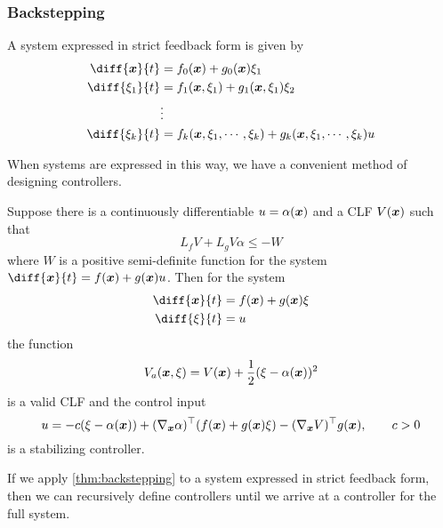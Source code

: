 \subsubsection{Backstepping}
\begin{definition}
	A system expressed in strict feedback form is given by \[
		\begin{aligned}
			\diff{\bs{x}}{t} &= f_0(\bs{x}) + g_0(\bs{x})\xi_1\\
			\diff{\xi_1}{t} &= f_1(\bs{x}, \xi_1) + g_1(\bs{x}, \xi_1)\xi_2\\
			&\vdots\\
			\diff{\xi_k}{t} &= f_k(\bs{x}, \xi_1,\cdots,\xi_k) + g_k(\bs{x},
			\xi_1,\cdots,\xi_k)u\\
		\end{aligned}
	\]
	\label{defn:strict-feedback-form}
\end{definition}
When systems are expressed in this way, we have a convenient method of designing
controllers.
\begin{theorem}
	Suppose there is a continuously differentiable $u=\alpha(\boldsymbol{x})$ and a CLF
	$V(\boldsymbol{x})$ such that \[
		L_fV + L_gV\alpha \leq -W
	\] where $W$ is a positive semi-definite function for the system
	$\diff{\bs{x}}{t} = f(\bs{x})+g(\bs{x})u$. Then for the system \[
		\begin{aligned}
			\diff{\bs{x}}{t} &= f(\bs{x}) + g(\bs{x})\xi\\
			\diff{\xi}{t} &= u
		\end{aligned}
	\]
	the function \[
		V_a(\boldsymbol{x},\xi) = V(\boldsymbol{x}) + \frac{1}{2}(\xi - \alpha(\boldsymbol{x}))^2
	\] is a valid CLF and the control input \[
		u = -c(\xi-\alpha(\boldsymbol{x})) + (\nabla_{\boldsymbol{x}}\alpha)^\top(f(\boldsymbol{x}) +
		g(\boldsymbol{x})\xi) - (\nabla_{\boldsymbol{x}}V)^\top g(\boldsymbol{x}), \qquad c > 0
	\]
	is a stabilizing controller.
	\label{thm:backstepping}
\end{theorem}
If we apply \cref{thm:backstepping} to a system expressed in strict feedback
form, then we can recursively define controllers until we arrive at a controller
for the full system.


